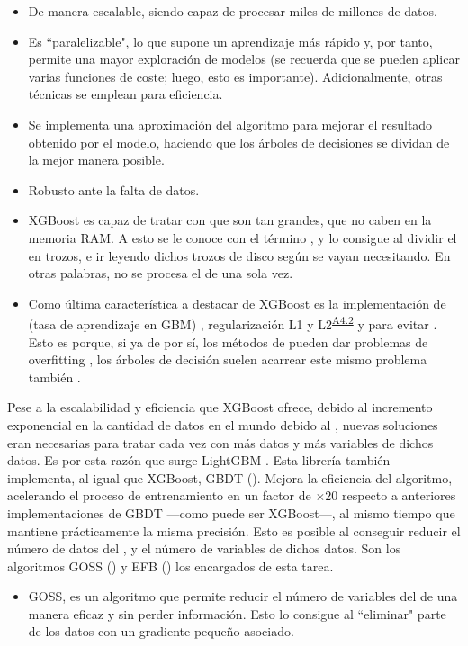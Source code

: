 {\begin{itemize}
    \item De manera escalable, siendo capaz de procesar miles de millones de datos.
    \item Es ``paralelizable", lo que supone un aprendizaje más rápido y, por tanto, permite una mayor exploración de modelos (se recuerda que se pueden aplicar varias funciones de coste; luego, esto es importante). Adicionalmente, otras técnicas se emplean para eficiencia.
    \item Se implementa una aproximación del algoritmo  para mejorar el resultado obtenido por el modelo, haciendo que los árboles de decisiones se dividan de la mejor manera posible.
    \item Robusto ante la falta de datos.
    \item XGBoost es capaz de tratar con  que son tan grandes, que no caben en la memoria RAM.  A esto se le conoce con el término , y  lo consigue al dividir el  en trozos, e ir leyendo dichos trozos de disco según se vayan necesitando. En otras palabras, no se procesa el  de una sola vez.
    \item Como última característica a destacar de XGBoost es la implementación de  (tasa de aprendizaje en GBM) \parencite{GBM}, regularización L1 y L2\textsuperscript{\hyperref[ap:L1L2sec]{A4.2}} y   para evitar . Esto es porque, si ya de por sí, los métodos de  pueden dar problemas de overfitting \parencite{boostingOverfitting}, los árboles de decisión suelen acarrear este mismo problema también \parencite{CARToverfitting}.
\end{itemize}

\bigskip

\bigskip


Pese a la escalabilidad  y eficiencia que XGBoost ofrece, debido al incremento exponencial en la cantidad de datos en el mundo debido al , nuevas soluciones eran necesarias para tratar cada vez con más datos y más variables de dichos datos. Es por esta razón que surge LightGBM \parencite{lightGBM}. Esta librería también implementa, al igual que XGBoost, GBDT (). Mejora la eficiencia del algoritmo, acelerando el proceso de entrenamiento en un factor de $\times20$ respecto a anteriores implementaciones de GBDT ---como puede ser  XGBoost---, al mismo tiempo que mantiene prácticamente la misma precisión. Esto es posible al conseguir reducir el número de datos del , y el número de variables de dichos datos. Son los algoritmos GOSS () y EFB () los encargados de esta tarea.
\begin{itemize}
    \item GOSS, es un algoritmo que permite reducir el número de variables del  de una manera eficaz y sin perder información. Esto lo consigue al ``eliminar" parte de los datos con un gradiente pequeño asociado. 
    

\end{itemize}}
